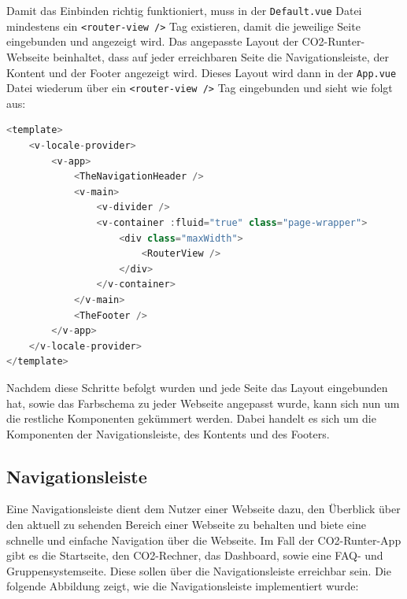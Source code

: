 Damit das Einbinden richtig funktioniert, muss in der \texttt{Default.vue} Datei mindestens ein \texttt{<router-view />} Tag existieren, damit die jeweilige Seite eingebunden und angezeigt wird.
Das angepasste Layout der CO2-Runter-Webseite beinhaltet, dass auf jeder erreichbaren Seite die Navigationsleiste, der Kontent und der Footer angezeigt wird.
Dieses Layout wird dann in der \texttt{App.vue} Datei wiederum über ein \texttt{<router-view />} Tag eingebunden und sieht wie folgt aus:

\begin{lstlisting}[language={JavaScript}, caption={Layout Definition}]
<template>
    <v-locale-provider>
        <v-app>
            <TheNavigationHeader />
            <v-main>
                <v-divider />
                <v-container :fluid="true" class="page-wrapper">
                    <div class="maxWidth">
                        <RouterView />
                    </div>
                </v-container>
            </v-main>
            <TheFooter />
        </v-app>
    </v-locale-provider>
</template>
\end{lstlisting}

Nachdem diese Schritte befolgt wurden und jede Seite das Layout eingebunden hat, sowie das Farbschema zu jeder Webseite angepasst wurde, kann sich nun um die restliche Komponenten gekümmert werden.
Dabei handelt es sich um die Komponenten der Navigationsleiste, des Kontents und des Footers.

\subsection{Navigationsleiste}

Eine Navigationsleiste dient dem Nutzer einer Webseite dazu, den Überblick über den aktuell zu sehenden Bereich einer Webseite zu behalten und biete eine schnelle und einfache Navigation über die Webseite.
Im Fall der CO2-Runter-App gibt es die Startseite, den CO2-Rechner, das Dashboard, sowie eine FAQ- und Gruppensystemseite.
Diese sollen über die Navigationsleiste erreichbar sein.
Die folgende Abbildung zeigt, wie die Navigationsleiste implementiert wurde:

